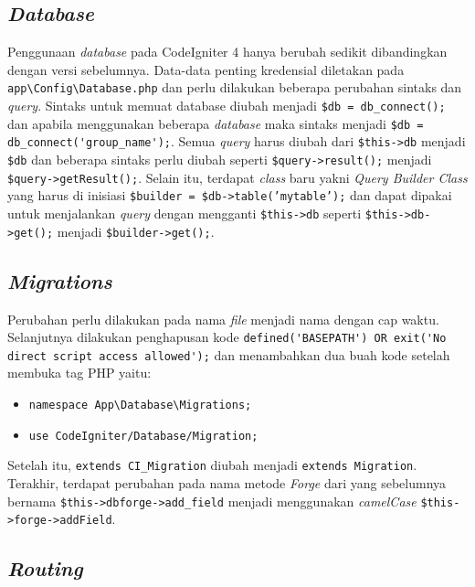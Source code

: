 \subsection{\textit{Database}}

Penggunaan \textit{database} pada CodeIgniter 4 hanya berubah sedikit dibandingkan dengan versi sebelumnya. Data-data penting kredensial diletakan pada \verb|app\Config\Database.php| dan perlu dilakukan beberapa perubahan sintaks dan \textit{query}. Sintaks untuk memuat database diubah menjadi \verb|$db = db_connect();| dan  apabila menggunakan beberapa \textit{database} maka sintaks menjadi \verb|$db = db_connect('group_name');|. Semua \textit{query} harus diubah dari \verb|$this->db| menjadi \verb|$db| dan beberapa sintaks perlu diubah seperti \verb|$query->result();| menjadi \verb|$query->getResult();|. Selain itu, terdapat \textit{class} baru yakni \textit{Query Builder Class} yang harus di inisiasi \texttt{\$builder = \$db->table('mytable');} dan dapat dipakai untuk menjalankan \textit{query} dengan mengganti \verb|$this->db| seperti \verb|$this->db->get();| menjadi \verb|$builder->get();|.

\subsection{\textit{Migrations}}

Perubahan perlu dilakukan pada nama \textit{file} menjadi nama dengan cap waktu. Selanjutnya dilakukan penghapusan kode \verb|defined('BASEPATH') OR exit('No direct script access allowed');| dan menambahkan dua buah kode setelah membuka tag PHP yaitu:
\begin{itemize}
	\item \verb|namespace App\Database\Migrations;|
	\item \texttt{use CodeIgniter/Database/Migration;}
\end{itemize}
  Setelah itu, \verb|extends CI_Migration| diubah menjadi \verb|extends Migration|. Terakhir, terdapat perubahan pada nama metode \textit{Forge} dari yang sebelumnya bernama \verb|$this->dbforge->add_field| menjadi menggunakan \textit{camelCase} \verb|$this->forge->addField|.

\subsection{\textit{Routing}}

